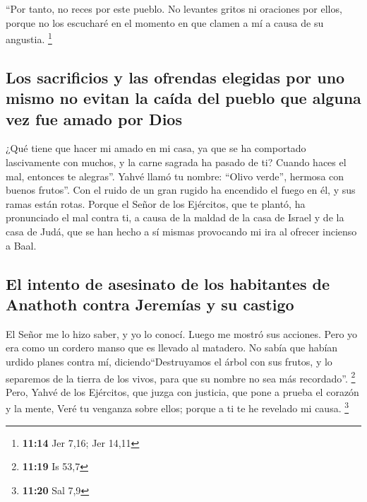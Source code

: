 \begin{paracol}{2}
 ``Por tanto, no reces por este pueblo. No levantes
gritos ni oraciones por ellos, porque no los escucharé en el momento en
que clamen a mí a causa de su angustia. \footnote{\textbf{11:14} Jer
  7,16; Jer 14,11}

\hypertarget{los-sacrificios-y-las-ofrendas-elegidas-por-uno-mismo-no-evitan-la-cauxedda-del-pueblo-que-alguna-vez-fue-amado-por-dios}{%
\subsection{Los sacrificios y las ofrendas elegidas por uno mismo no
evitan la caída del pueblo que alguna vez fue amado por
Dios}\label{los-sacrificios-y-las-ofrendas-elegidas-por-uno-mismo-no-evitan-la-cauxedda-del-pueblo-que-alguna-vez-fue-amado-por-dios}}

 ¿Qué tiene que hacer mi amado en mi casa, ya que se ha
comportado lascivamente con muchos, y la carne sagrada ha pasado de ti?
Cuando haces el mal, entonces te alegras''.  Yahvé llamó
tu nombre: ``Olivo verde'', hermosa con buenos frutos''. Con el ruido de
un gran rugido ha encendido el fuego en él, y sus ramas están rotas.
 Porque el Señor de los Ejércitos, que te plantó, ha
pronunciado el mal contra ti, a causa de la maldad de la casa de Israel
y de la casa de Judá, que se han hecho a sí mismas provocando mi ira al
ofrecer incienso a Baal.

\hypertarget{el-intento-de-asesinato-de-los-habitantes-de-anathoth-contra-jeremuxedas-y-su-castigo}{%
\subsection{El intento de asesinato de los habitantes de Anathoth contra
Jeremías y su
castigo}\label{el-intento-de-asesinato-de-los-habitantes-de-anathoth-contra-jeremuxedas-y-su-castigo}}

 El Señor me lo hizo saber, y yo lo conocí. Luego me
mostró sus acciones.  Pero yo era como un cordero manso
que es llevado al matadero. No sabía que habían urdido planes contra mí,
diciendo``Destruyamos el árbol con sus frutos, y lo separemos de la
tierra de los vivos, para que su nombre no sea más recordado''.
\footnote{\textbf{11:19} Is 53,7}  Pero, Yahvé de los
Ejércitos, que juzga con justicia, que pone a prueba el corazón y la
mente, Veré tu venganza sobre ellos; porque a ti te he revelado mi
causa. \footnote{\textbf{11:20} Sal 7,9}


\end{paracol}

